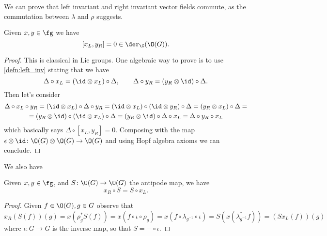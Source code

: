 \documentclass[a4paper, 10pt]{article}
\begin{document}
            We can prove that left invariant and right invariant vector fields commute, as the commutation between $\lambda$ and $\rho$ suggests.

            \begin{lemma}
                \label{lemma:commutation}
                Given $x, y \in \fg$ we have \[[x_L, y_R] = 0 \in \der_{\C}(\O(G)). \]
            \end{lemma}
            \begin{proof}
                This is classical in Lie groups.
                One algebraic way to prove is to use \cref{defn:left_inv} stating that we have \[\Delta \circ x_L = (\id \otimes x_L) \circ \Delta, \qquad \Delta \circ y_R = (y_R \otimes \id) \circ \Delta. \] Then let's consider 
                \begin{gather*}
                    \Delta \circ x_L \circ y_R = (\id \otimes x_L) \circ \Delta \circ y_R = (\id \otimes x_L) \circ (\id \otimes y_R) \circ \Delta = (y_R \otimes x_L) \circ \Delta = \\
                    = (y_R \otimes \id) \circ (\id \otimes x_L) \circ \Delta = (y_R \otimes \id) \circ \Delta \circ x_L = \Delta \circ y_R \circ x_L
                \end{gather*}
                which basically says $\Delta \circ [x_L, y_R] = 0$. Composing with the map $\epsilon \otimes \id\colon \O(G) \otimes \O(G) \to \O(G)$ and using Hopf algebra axioms we can conclude.
            \end{proof}
            We also have 
            \begin{lemma}
                \label{lemma:antipode}
                Given $x, y \in \fg$, and $S\colon \O(G) \to \O(G)$ the antipode map, we have \[x_R \circ S = S \circ x_L.\]
            \end{lemma}
            \begin{proof}
                Given $f \in \O(G), g \in G$ observe that \[x_R(S(f))(g) = x(\rho_g^*S(f)) = x(f \circ \iota \circ \rho_g) = x(f \circ \lambda_{g^{-1}} \circ \iota) = S(x(\lambda_{g^{-1}}^*f)) = (Sx_L(f))(g) \] where $\iota\colon G \to G$ is the inverse map, so that $S = - \circ \iota$.
            \end{proof}
\end{document}
